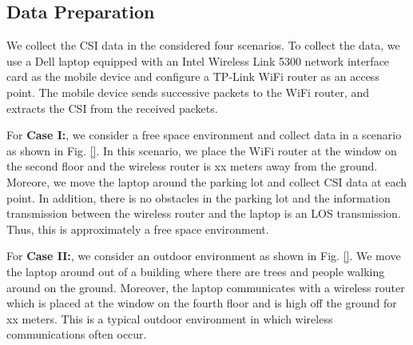 \documentclass[10pt,journal,cspaper,compsoc]{IEEEtran}
\begin{document}
\subsection{Data Preparation}
\label{subsubsec:case1-data}

We collect the CSI data in the considered four scenarios. To collect the data, we use a Dell laptop equipped with an Intel Wireless Link 5300 network interface card as the mobile device and configure a TP-Link WiFi router as an access point. The mobile device sends successive packets to the WiFi router, and extracts the CSI from the received packets.

For \textbf{Case I:}, we consider a free space environment and collect data in a scenario as shown in Fig. \ref{}. In this scenario, we place the WiFi router at the window on the second floor and the wireless router is xx meters away from the ground. Moreore, we move the laptop around the parking lot and collect CSI data at each point. In addition, there is no obstacles in the parking lot and the information transmission between the wireless router and the laptop is an LOS transmission. Thus, this is approximately a free space environment. 



For \textbf{Case II:}, we consider an outdoor environment as shown in Fig. \ref{}. We move the laptop around out of a building where there are trees and people walking around on the ground. Moreover, the laptop communicates with a wireless router which is placed at the window on the fourth floor and is high off the ground for xx meters. This is a typical outdoor environment in which wireless communications often occur. 

\end{document}
